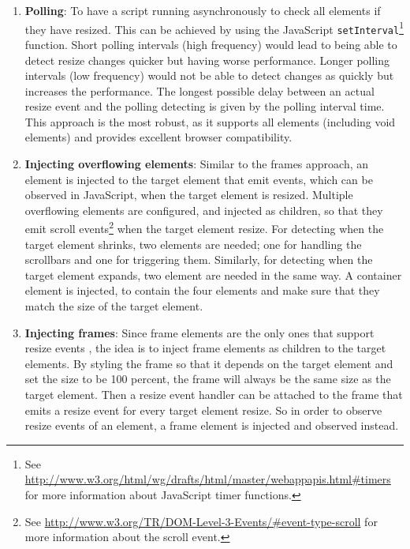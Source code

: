 \documentclass[a4paper,11pt]{kth-mag}
\newcommand{\code}[1]{\texttt{#1}}
\begin{document}
        \begin{enumerate}
          \item\label{itm:erd-approach-polling} \textbf{Polling}:
            To have a script running asynchronously to check all \glspl{element} if they have resized.
            This can be achieved by using the \gls{JavaScript} \code{setInterval}\footnote{See \url{http://www.w3.org/html/wg/drafts/html/master/webappapis.html\#timers} for more information about \gls{JavaScript} timer functions.} function.
            Short polling intervals (high frequency) would lead to being able to detect resize changes quicker but having worse performance.
            Longer polling intervals (low frequency) would not be able to detect changes as quickly but increases the performance.
            The longest possible delay between an actual resize event and the polling detecting is given by the polling interval time.
            This approach is the most robust, as it supports all elements (including void elements) and provides excellent browser compatibility.
          \item\label{itm:erd-approach-scroll} \textbf{Injecting overflowing \glspl{element}}:
            Similar to the frames approach, an \gls{element} is injected to the target element that emit events, which can be observed in JavaScript, when the target element is resized.
            Multiple overflowing elements are configured, and injected as children, so that they emit scroll events\footnote{See \url{http://www.w3.org/TR/DOM-Level-3-Events/\#event-type-scroll} for more information about the scroll event.} when the target element resize.
            For detecting when the target \gls{element} shrinks, two \glspl{element} are needed; one for handling the scrollbars and one for triggering them.
            Similarly, for detecting when the target \gls{element} expands, two \gls{element} are needed in the same way.
            A container \gls{element} is injected, to contain the four \glspl{element} and make sure that they match the size of the target element.
          \item\label{itm:erd-approach-frame} \textbf{Injecting frames}:
            Since frame \glspl{element} are the only ones that support resize events , the idea is to inject frame \glspl{element} as children to the target \glspl{element}.
            By styling the frame so that it depends on the target \gls{element} and set the size to be 100 percent, the frame will always be the same size as the target element.
            Then a resize event handler can be attached to the frame that emits a resize event for every target \gls{element} resize.
            So in order to observe resize events of an element, a frame \gls{element} is injected and observed instead.
        \end{enumerate}
\end{document}
